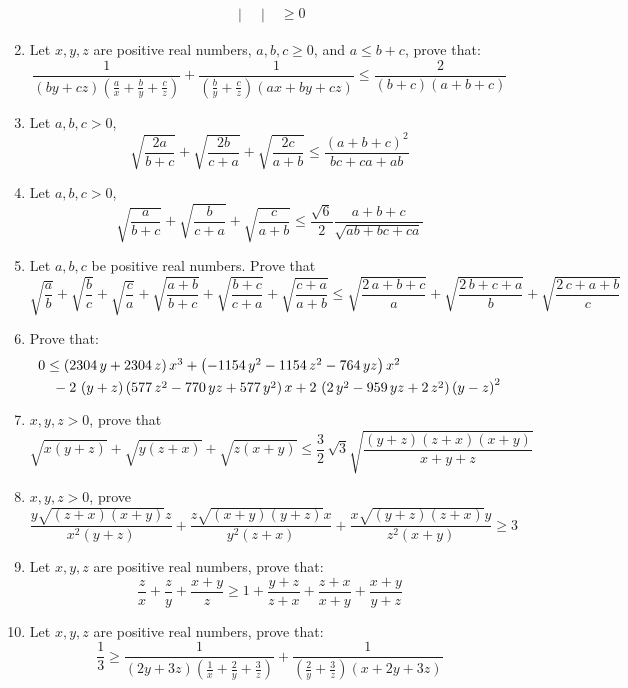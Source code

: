 \documentclass{report}
\begin{document}
\begin{enumerate}
\begin{align*}
\begin{vmatrix}
	\end{vmatrix} & \geq 0
	\end{align*}
	\item Let $ x,y,z$ are positive real numbers, $ a,b,c \geq 0$, and $ a \le b + c$, prove that:$$ \frac {1}{(by + cz)(\frac {a}{x} + \frac {b}{y} + \frac {c}{z})} + \frac {1}{(\frac {b}{y} + \frac {c}{z})(ax + by + cz)} \le \frac {2}{(b + c)(a + b + c)}$$
	\item Let $ a,b,c > 0$,$$ \sqrt {\frac {2a}{b + c}} + \sqrt {\frac {2b}{c + a}} + \sqrt {\frac {2c}{a + b}}\le \frac {(a + b + c)^2}{bc + ca + ab}$$
	\item Let $ a,b,c > 0$,$$ \sqrt{\frac{a}{b+c}}+\sqrt{\frac{b}{c+a}}+\sqrt{\frac{c}{a+b}} \le \frac{\sqrt{6}}{2}\frac{a+b+c}{\sqrt{ab+bc+ca}}$$
	
	
	
	
	
	
	
	
	
	
	
	
	
	
	
	
	
	
	
	
	
	
	
	
	
	
	\item Let $a,b,c$ be positive real numbers. Prove that$$\sqrt {{\frac {a}{b}}}+\sqrt {{\frac {b}{c}}}+\sqrt {{\frac {c}{a}}}+\sqrt {{\frac {a+b}{b+c}}}+\sqrt {{\frac {b+c}{c+a}}}+\sqrt {{\frac {c+a}{a+b}}}\leq \sqrt {{\frac {2\,a+b+c}{a}}}+\sqrt {{\frac {2\,b+c+a}{b}}}+\sqrt {{\frac {2\,c+a+b}{c}}}$$
	\item Prove that:$$\splitdfrac{0\leq  \left( 2304\,y+2304\,z \right) {x}^{3}+ \left( -1154\,{y}^{2}-1154\,{z}^{2}-764\,yz \right) {x}^{2}}{-2\, \left( y+z \right)  \left( 577\,{z}^{2}-770\,yz+577\,{y}^{2} \right) x+2\, \left( 2\,{y}^{2}-959\,yz+2\,{z}^{2} \right)  \left( y-z \right) ^{2}}$$
	\item 
	$x,y,z>0$, prove that\[\sqrt {x \left( y+z \right) }+\sqrt {y \left( z+x \right) }+\sqrt {z\left( x+y \right) }\leq \frac{3}{2}\,\sqrt {3}\sqrt {{\frac { \left( y+z\right)  \left( z+x \right)  \left( x+y \right) }{x+y+z}}}\]
	\item $x,y,z>0$, prove\[{\frac {y\sqrt { \left( z+x \right)  \left( x+y \right) }z}{{x}^{2}\left( y+z \right) }}+{\frac {z\sqrt { \left( x+y \right)  \left( y+z\right) }x}{{y}^{2} \left( z+x \right) }}+{\frac {x\sqrt { \left( y+z\right)\left( z+x \right) }y}{{z}^{2} \left( x+y \right) }}\geq 3\]
	\item Let $ x,y,z$ are positive real numbers, prove that: $$\frac{z}{x}+\frac{z}{y}+\frac{x+y}{z}\geq1+\frac{y+z}{z+x}+\frac{z+x}{x+y}+\frac{x+y}{y+z}$$
	\item Let $ x,y,z$ are positive real numbers, prove that:$$ \frac {1}{3} \geq \frac {1}{(2y + 3z)(\frac {1}{x} + \frac {2}{y} + \frac {3}{z})} + \frac {1}{(\frac {2}{y} + \frac {3}{z})(x + 2 y + 3 z)}$$
\end{enumerate}
\end{document}
